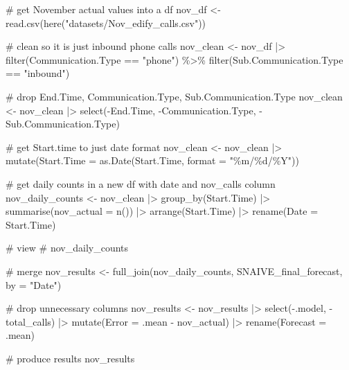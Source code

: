 \documentclass[
  letterpaper,
  DIV=11,
  numbers=noendperiod]{scrartcl}
\newenvironment{Shaded}{\begin{snugshade}}{\end{snugshade}}
\newcommand{\AttributeTok}[1]{\textcolor[rgb]{0.40,0.45,0.13}{#1}}
\newcommand{\CommentTok}[1]{\textcolor[rgb]{0.37,0.37,0.37}{#1}}
\newcommand{\FunctionTok}[1]{\textcolor[rgb]{0.28,0.35,0.67}{#1}}
\newcommand{\NormalTok}[1]{\textcolor[rgb]{0.00,0.23,0.31}{#1}}
\newcommand{\OtherTok}[1]{\textcolor[rgb]{0.00,0.23,0.31}{#1}}
\newcommand{\SpecialCharTok}[1]{\textcolor[rgb]{0.37,0.37,0.37}{#1}}
\newcommand{\StringTok}[1]{\textcolor[rgb]{0.13,0.47,0.30}{#1}}
\begin{document}
\begin{Shaded}
\begin{Highlighting}[]
\CommentTok{\# get November actual values into a df}
\NormalTok{nov\_df }\OtherTok{\textless{}{-}} \FunctionTok{read.csv}\NormalTok{(}\FunctionTok{here}\NormalTok{(}\StringTok{"datasets/Nov\_edify\_calls.csv"}\NormalTok{))}

\CommentTok{\# clean so it is just inbound phone calls}
\NormalTok{nov\_clean }\OtherTok{\textless{}{-}}\NormalTok{ nov\_df }\SpecialCharTok{|\textgreater{}} 
  \FunctionTok{filter}\NormalTok{(Communication.Type }\SpecialCharTok{==} \StringTok{"phone"}\NormalTok{) }\SpecialCharTok{\%\textgreater{}\%}
  \FunctionTok{filter}\NormalTok{(Sub.Communication.Type }\SpecialCharTok{==} \StringTok{"inbound"}\NormalTok{)}

\CommentTok{\# drop End.Time, Communication.Type, Sub.Communication.Type}
\NormalTok{nov\_clean }\OtherTok{\textless{}{-}}\NormalTok{ nov\_clean }\SpecialCharTok{|\textgreater{}} 
  \FunctionTok{select}\NormalTok{(}\SpecialCharTok{{-}}\NormalTok{End.Time, }\SpecialCharTok{{-}}\NormalTok{Communication.Type, }\SpecialCharTok{{-}}\NormalTok{Sub.Communication.Type)}

\CommentTok{\# get Start.time to just date format}
\NormalTok{nov\_clean }\OtherTok{\textless{}{-}}\NormalTok{ nov\_clean }\SpecialCharTok{|\textgreater{}}
  \FunctionTok{mutate}\NormalTok{(}\AttributeTok{Start.Time =} \FunctionTok{as.Date}\NormalTok{(Start.Time, }\AttributeTok{format =} \StringTok{"\%m/\%d/\%Y"}\NormalTok{))}

\CommentTok{\# get daily counts in a new df with date and nov\_calls column}
\NormalTok{nov\_daily\_counts }\OtherTok{\textless{}{-}}\NormalTok{ nov\_clean }\SpecialCharTok{|\textgreater{}} 
  \FunctionTok{group\_by}\NormalTok{(Start.Time) }\SpecialCharTok{|\textgreater{}} 
  \FunctionTok{summarise}\NormalTok{(}\AttributeTok{nov\_actual =} \FunctionTok{n}\NormalTok{()) }\SpecialCharTok{|\textgreater{}} 
  \FunctionTok{arrange}\NormalTok{(Start.Time) }\SpecialCharTok{|\textgreater{}} 
  \FunctionTok{rename}\NormalTok{(}\AttributeTok{Date =}\NormalTok{ Start.Time)}

\CommentTok{\# view}
\CommentTok{\# nov\_daily\_counts}

\CommentTok{\# merge}
\NormalTok{nov\_results }\OtherTok{\textless{}{-}} \FunctionTok{full\_join}\NormalTok{(nov\_daily\_counts, SNAIVE\_final\_forecast, }\AttributeTok{by =} \StringTok{"Date"}\NormalTok{)}

\CommentTok{\# drop unnecessary columns}
\NormalTok{nov\_results }\OtherTok{\textless{}{-}}\NormalTok{ nov\_results }\SpecialCharTok{|\textgreater{}} 
  \FunctionTok{select}\NormalTok{(}\SpecialCharTok{{-}}\NormalTok{.model, }\SpecialCharTok{{-}}\NormalTok{total\_calls) }\SpecialCharTok{|\textgreater{}}
  \FunctionTok{mutate}\NormalTok{(}\AttributeTok{Error =}\NormalTok{ .mean }\SpecialCharTok{{-}}\NormalTok{ nov\_actual) }\SpecialCharTok{|\textgreater{}} 
  \FunctionTok{rename}\NormalTok{(}\AttributeTok{Forecast =}\NormalTok{ .mean)}

\CommentTok{\# produce results}
\NormalTok{nov\_results}
\end{Highlighting}
\end{Shaded}
\end{document}
